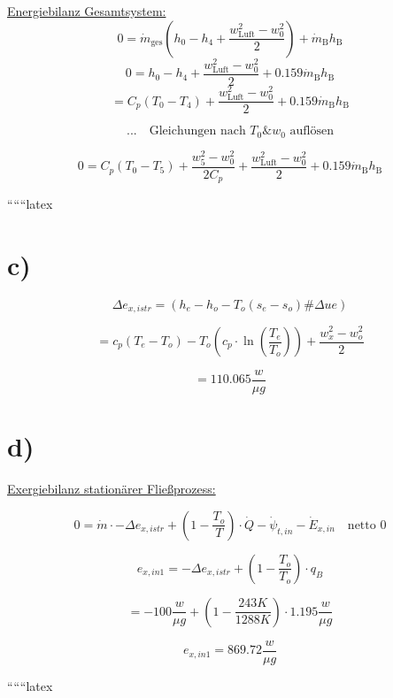 \underline{Energiebilanz Gesamtsystem:}
\[
0 = \dot{m}_{\text{ges}} \left( h_0 - h_4 + \frac{w_{\text{Luft}}^2 - w_0^2}{2} \right) + \dot{m}_{\text{B}} h_{\text{B}}
\]
\[
0 = h_0 - h_4 + \frac{w_{\text{Luft}}^2 - w_0^2}{2} + 0.159 \dot{m}_{\text{B}} h_{\text{B}}
\]
\[
= C_p \left( T_0 - T_4 \right) + \frac{w_{\text{Luft}}^2 - w_0^2}{2} + 0.159 \dot{m}_{\text{B}} h_{\text{B}}
\]

\[
\text{...} \quad \text{Gleichungen nach } T_0 \& w_0 \text{ auflösen}
\]

\[
0 = C_p \left( T_0 - T_5 \right) + \frac{w_5^2 - w_0^2}{2 C_p} + \frac{w_{\text{Luft}}^2 - w_0^2}{2} + 0.159 \dot{m}_{\text{B}} h_{\text{B}}
\]

``````latex


\section*{c)}

\[
\Delta e_{x,istr} = (h_{e} - h_{o} - T_{o}(s_{e} - s_{o}) \# \Delta u e)
\]

\[
= c_p (T_{e} - T_{o}) - T_{o} \left( c_p \cdot \ln \left( \frac{T_{e}}{T_{o}} \right) \right) + \frac{w_{x}^2 - w_{o}^2}{2}
\]

\[
= 110.065 \frac{w}{\mu g}
\]

\section*{d)}

\underline{Exergiebilanz stationärer Fließprozess:}

\[
0 = \dot{m} \cdot -\Delta e_{x,istr} + \left( 1 - \frac{T_{o}}{T} \right) \cdot \dot{Q} - \dot{\psi}_{t,in} - \dot{E}_{x,in} \quad \text{netto 0}
\]

\[
e_{x,in1} = -\Delta e_{x,istr} + \left( 1 - \frac{T_{o}}{T_{o}} \right) \cdot q_{B}
\]

\[
= -100 \frac{w}{\mu g} + \left( 1 - \frac{243 K}{1288 K} \right) \cdot 1.195 \frac{w}{\mu g}
\]

\[
e_{x,in1} = 869.72 \frac{w}{\mu g}
\]

``````latex


